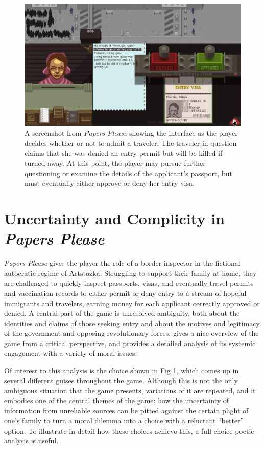 \documentclass[arts,article,submit,moreauthors,pdftex,10pt,a4paper]{Definitions/mdpi}
\begin{document}
\begin{figure}[H]
  \includegraphics[width=\textwidth]{fig/papers-please-visa-choice.png}
  \caption{A screenshot from \emph{Papers Please} showing the interface as the player decides whether or not to admit a traveler. The traveler in question claims that she was denied an entry permit but will be killed if turned away. At this point, the player may pursue further questioning or examine the details of the applicant's passport, but must eventually either approve or deny her entry visa.}
  \label{fig:PP_visa}
\end{figure}

\section{Uncertainty and Complicity in \emph{Papers Please}}

\emph{Papers Please} \citep{pope2013papers} gives the player the role of a border inspector in the fictional autocratic regime of Artstozka.
%
Struggling to support their family at home, they are challenged to quickly inspect passports, visas, and eventually travel permits and vaccination records to either permit or deny entry to a stream of hopeful immigrants and travelers, earning money for each applicant correctly approved or denied.
%
A central part of the game is unresolved ambiguity, both about the identities and claims of those seeking entry and about the motives and legitimacy of the government and opposing revolutionary forces.
%
\cite{alexander2013designing} gives a nice overview of the game from a critical perspective, and \cite{formosa2016papers} provides a detailed analysis of its systemic engagement with a variety of moral issues.


Of interest to this analysis is the choice shown in Fig \ref{fig:PP_visa}, which comes up in several different guises throughout the game.
%
Although this is not the only ambiguous situation that the game presents, variations of it are repeated, and it embodies one of the central themes of the game: how the uncertainty of information from unreliable sources can be pitted against the certain plight of one's family to turn a moral dilemma into a choice with a reluctant ``better'' option.
%
To illustrate in detail how these choices achieve this, a full choice poetic analysis is useful.
\end{document}
